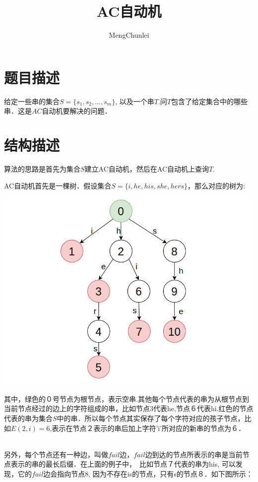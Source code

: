 \documentclass{article}
\title{AC自动机}
\author{MengChunlei}
\begin{document}
\maketitle
\section{题目描述}
给定一些串的集合$S=\{s_{1},s_{2},...,s_{m}\}$, 以及一个串$T$.问$T$包含了给定集合中的哪些串．这是$AC$自动机要解决的问题． \par
\section{结构描述}
算法的思路是首先为集合$S$建立AC自动机，然后在AC自动机上查询$T$.\par
AC自动机首先是一棵树．假设集合$S=\{i, he, his, she, hers\}$，那么对应的树为: \par
\includegraphics[scale=0.45]{pic1.png} \par
其中，绿色的０号节点为根节点，表示空串.其他每个节点代表的串为从根节点到当前节点经过的边上的字符组成的串，比如节点3代表he,节点６代表hi.红色的节点代表的串为集合$S$中的串．所以每个节点其实保存了每个字符对应的孩子节点，比如$E(2,i)=6$,表示在节点２表示的串后加上字符'i'所对应的新串的节点为６．\par
~\\
另外，每个节点还有一种边，叫做$fail$边，$fail$边到达的节点所表示的串是当前节点表示的串的最长后缀．在上面的例子中，　比如节点７代表的串为his, 可以发现，它的$fail$边会指向节点8, 因为不存在is的节点，只有s的节点８．如下图所示：　\par
\end{document}
